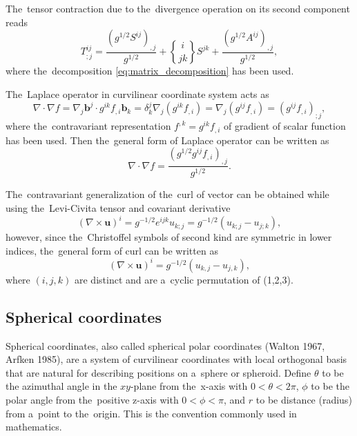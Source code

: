 \documentclass[preprint,12pt]{elsarticle}
\newcommand{\vect}[1]{\boldsymbol{#1}}
\newcommand{\christ}[3]{\genfrac{\{}{\}}{0pt}{}{#1}{#2 #3}}
\newcounter{bla}
\begin{document}
The~tensor contraction due to the~divergence operation on its second component
reads
\begin{equation}
  T^{ij}_{;j} = \frac{(g^{1/2}S^{ij})_{,j}}{g^{1/2}} + \christ{i}{j}{k}S^{jk} 
  + \frac{(g^{1/2}A^{ij})_{,j}}{g^{1/2}} ,
  \label{eq:general_divtens}
\end{equation}
where the~decomposition \eqref{eq:matrix_decomposition} has been used.

The~Laplace operator in curvilinear coordinate system acts as
\begin{equation}
  \nabla\cdot\nabla f = \nabla_j\vect{b}^j\cdot g^{ik}f_{,i}\vect{b}_k = 
  \delta^j_k \nabla_j (g^{ik}f_{,i}) = \nabla_j (g^{ij}f_{,i}) 
  = (g^{ij}f_{,i})_{;j} , 
  \nonumber
\end{equation}
where the~contravariant representation $f^{,k} = g^{ik}f_{,i}$ of gradient
of scalar function has been used.
Then the~general form of Laplace operator can be written as
\begin{equation}
  \nabla\cdot\nabla f = \frac{(g^{1/2}g^{ij}f_{,i})_{,j}}{g^{1/2}} .
  \label{eq:general_Laplace}
\end{equation}

The~contravariant generalization of the~curl of vector can be obtained while
using the~Levi-Civita tensor and covariant derivative
\begin{equation}
  (\nabla\times\vect{u})^i = g^{-1/2}e^{ijk} u_{k;j} 
  = g^{-1/2} (u_{k;j} - u_{j;k}) ,
  \nonumber
\end{equation} 
however, since the~Christoffel symbols of second kind are symmetric in lower 
indices, the~general form of curl can be written as 
\begin{equation}
  (\nabla\times\vect{u})^i = g^{-1/2} (u_{k,j} - u_{j,k}) ,
  \label{eq:general_curlvec}
\end{equation} 
where $(i,j,k)$ are distinct and are a~cyclic permutation of (1,2,3).

\subsection{Spherical coordinates}
Spherical coordinates, also called spherical polar coordinates 
(Walton 1967, Arfken 1985), are a system of curvilinear coordinates with 
local orthogonal basis that are natural for describing positions on a~sphere 
or spheroid. Define $\theta$ to be the azimuthal angle in the $xy$-plane from 
the~x-axis with $0<\theta<2\pi$, $\phi$ to be the polar angle from 
the~positive z-axis with $0<\phi<\pi$, and $r$ to be distance (radius) from 
a~point to the~origin. This is the convention commonly used in mathematics. 
\end{document}
